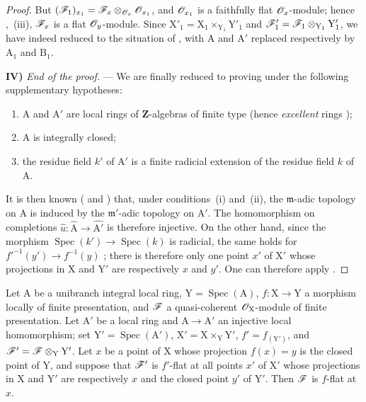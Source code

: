 \begin{proof}
But $(\mathscr{F}_1)_{x_1}=\mathscr{F}_x\otimes_{\mathscr{O}_x}\mathscr{O}_{x_1}$, and $\mathscr{O}_{x_1}$ is a faithfully flat $\mathscr{O}_x$-module; hence ,~(iii), $\mathscr{F}_x$ is a flat $\mathscr{O}_y$-module.
Since $\mathrm{X}'_1=\mathrm{X}_1\times_{\mathrm{Y}_1}\mathrm{Y}'_1$ and $\mathscr{F}'_1=\mathscr{F}_1\otimes_{\mathrm{Y}_1}\mathrm{Y}'_1$, we have indeed reduced to the situation of , with $\mathrm{A}$ and $\mathrm{A}'$ replaced respectively by $\mathrm{A}_1$ and $\mathrm{B}_1$.

\medskip
\noindent\textbf{IV)} \emph{End of the proof.} --- We are finally reduced to proving  under the following supplementary hypotheses:
\begin{enumerate}[label=(\roman*)]
  \item $\mathrm{A}$ and $\mathrm{A}'$ are local rings of $\mathbf{Z}$-algebras of finite type (hence \emph{excellent} rings );
  \item $\mathrm{A}$ is integrally closed;
  \item the residue field $k'$ of $\mathrm{A}'$ is a finite radicial extension of the residue field $k$ of $\mathrm{A}$.
\end{enumerate}
It is then known ( and ) that, under conditions~(i) and~(ii), the $\mathfrak{m}$-adic topology on $\mathrm{A}$ is induced by the $\mathfrak{m}'$-adic topology on $\mathrm{A}'$.
The homomorphism on completions $\widehat{u}:\widehat{\mathrm{A}}\to\widehat{\mathrm{A}'}$ is therefore injective.
On the other hand, since the morphism $\operatorname{Spec}(k')\to\operatorname{Spec}(k)$ is radicial, the same holds for $f'^{-1}(y')\to f^{-1}(y)$ ; there is therefore only one point $x'$ of $\mathrm{X}'$ whose projections in $\mathrm{X}$ and $\mathrm{Y}'$ are respectively $x$ and $y'$.
One can therefore apply .
\end{proof}

\begin{corollary}[11.6.2]
\label{IV.11.6.2}
Let $\mathrm{A}$ be a unibranch integral local ring, $\mathrm{Y}=\operatorname{Spec}(\mathrm{A})$, $f:\mathrm{X}\to\mathrm{Y}$ a morphism locally of finite presentation, and $\mathscr{F}$ a quasi-coherent $\mathscr{O}_\mathrm{X}$-module of finite presentation.
Let $\mathrm{A}'$ be a local ring and $\mathrm{A}\to\mathrm{A}'$ an injective local homomorphism; set $\mathrm{Y}'=\operatorname{Spec}(\mathrm{A}')$, $\mathrm{X}'=\mathrm{X}\times_\mathrm{Y}\mathrm{Y}'$, $f'=f_{(\mathrm{Y}')}$, and $\mathscr{F}'=\mathscr{F}\otimes_\mathrm{Y}\mathrm{Y}'$.
Let $x$ be a point of $\mathrm{X}$ whose projection $f(x)=y$ is the closed point of $\mathrm{Y}$, and suppose that $\mathscr{F}'$ is $f'$-flat at all points $x'$ of $\mathrm{X}'$ whose projections in $\mathrm{X}$ and $\mathrm{Y}'$ are respectively $x$ and the closed point $y'$ of $\mathrm{Y}'$.
Then $\mathscr{F}$ is $f$-flat at $x$.
\end{corollary}

